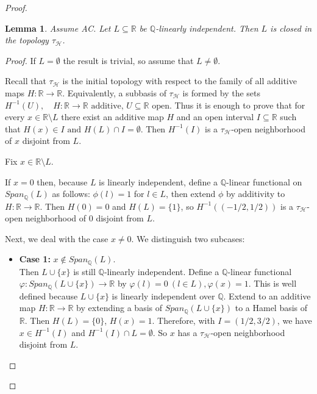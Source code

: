 \documentclass[11pt]{amsart} %
\newtheorem{lemma}[theorem]{Lemma}
\theoremstyle{definition}
\newcommand{\R}{\mathbb{R}}
\newcommand{\Q}{\mathbb{Q}}
\newcommand{\AD}{\mathcal{H}}
\begin{document}
\begin{proof}
\begin{lemma}
\label{lem:7.7}
Assume AC. 
Let $L\subseteq\mathbb{R}$ be $\mathbb{Q}$-linearly independent. Then $L$ is closed in the topology $\tau_{\AD}$.
\end{lemma}

\begin{proof}
If $L=\emptyset$ the result is trivial, so assume that $L\neq \emptyset$. 

Recall that $\tau_{\AD}$ is the initial topology with respect to the family of all additive maps $H:\mathbb{R}\rightarrow\mathbb{R}$. Equivalently, a subbasis of $\tau_{\AD}$ is formed by the sets
$H^{-1}(U), \quad H:\mathbb{R}\rightarrow\mathbb{R} \text{ additive, } U\subseteq\mathbb{R} \text{ open.}$
Thus it is enough to prove that for every $x\in\mathbb{R}\setminus L$ there exist an additive map $H$ and an open interval $I\subseteq\mathbb{R}$ such that $H(x)\in I \text{ and } H(L)\cap I=\emptyset. $
Then $H^{-1}(I)$ is a $\tau_{\AD}$-open neighborhood of $x$ disjoint from $L$.

Fix $x\in\mathbb{R}\setminus L$. 

If $x=0$ then, because $L$ is linearly independent, define a $\Q$-linear functional on $Span_{\Q}(L)$ as follows: $\phi(l)=1$ for $l\in L$, then extend $\phi$ by additivity to $H:\R\rightarrow \R$. Then $H(0)=0$ and $H(L)=\{1\}$, so $H^{-1}((-1/2,1/2))$ is a $\tau_{\AD}$-open neighborhood of 0 disjoint from $L$. 

Next, we deal with the case $x\neq 0$. We distinguish two subcases: 

\begin{itemize} 
\item[-] \noindent \textbf{Case 1:} $x\notin Span_{\mathbb{Q}}(L)$. \\
Then $L\cup\{x\}$ is still $\mathbb{Q}$-linearly independent. Define a $\mathbb{Q}$-linear functional $\varphi:Span_{\mathbb{Q}}(L\cup\{x\})\rightarrow\mathbb{R}$ by
$\varphi(l)=0 \ (l\in L), \varphi(x)=1.$ 
This is well defined because $L\cup\{x\}$ is linearly independent over $\mathbb{Q}$. Extend to an additive map $H:\mathbb{R}\rightarrow\mathbb{R}$ by extending a basis of $Span_{\mathbb{Q}}(L\cup\{x\})$ to a Hamel basis of $\mathbb{R}$. Then $H(L)=\{0\}$, $H(x)=1$. Therefore, with $I=(1/2,3/2)$, we have $x\in H^{-1}(I)$ and $H^{-1}(I)\cap L=\emptyset$. So $x$ has a $\tau_{\AD}$-open neighborhood disjoint from $L$.


\end{itemize}
\end{proof}
\end{proof}
\end{document}
